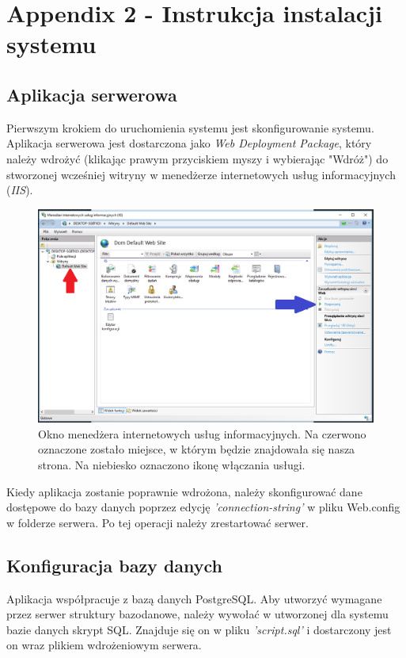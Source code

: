 \chapter{Appendix 2 - Instrukcja instalacji systemu}

	\section{Aplikacja serwerowa}
	
	Pierwszym krokiem do uruchomienia systemu jest skonfigurowanie systemu. Aplikacja serwerowa jest dostarczona jako \textit{Web Deployment Package}, który należy wdrożyć (klikając prawym przyciskiem myszy i wybierając "Wdróż") do stworzonej wcześniej witryny w menedżerze internetowych usług informacyjnych (\textit{IIS}). 
	\begin{figure}[H]			
		\centering
		\caption{Okno menedżera internetowych usług informacyjnych. Na czerwono oznaczone zostało miejsce, w którym będzie znajdowała się nasza strona. Na niebiesko oznaczono ikonę włączania usługi.}
		\includegraphics[width=1.0\textwidth]{iis}
	\end{figure}
	Kiedy aplikacja zostanie poprawnie wdrożona, należy skonfigurować dane dostępowe do bazy danych poprzez edycję \textit{'connection-string'} w pliku Web.config w folderze serwera. Po tej operacji należy zrestartować serwer.\\	
	
	\section{Konfiguracja bazy danych}
	
	Aplikacja współpracuje z bazą danych PostgreSQL. Aby utworzyć wymagane przez serwer struktury bazodanowe, należy wywołać w utworzonej dla systemu bazie danych skrypt SQL. Znajduje się on w pliku \textit{'script.sql'} i dostarczony jest on wraz plikiem wdrożeniowym serwera.
		
